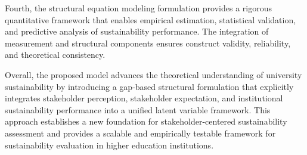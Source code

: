 \documentclass[11pt,a4paper]{article}
\begin{document}
Fourth, the structural equation modeling formulation provides a rigorous quantitative framework that enables empirical estimation, statistical validation, and predictive analysis of sustainability performance. The integration of measurement and structural components ensures construct validity, reliability, and theoretical consistency.

Overall, the proposed model advances the theoretical understanding of university sustainability by introducing a gap-based structural formulation that explicitly integrates stakeholder perception, stakeholder expectation, and institutional sustainability performance into a unified latent variable framework. This approach establishes a new foundation for stakeholder-centered sustainability assessment and provides a scalable and empirically testable framework for sustainability evaluation in higher education institutions.



\end{document}
